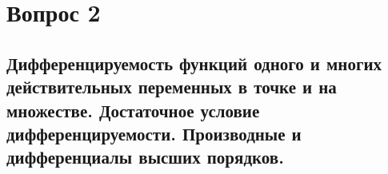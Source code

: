 \section{Вопрос 2}

\subsection{Дифференцируемость функций одного и многих действительных переменных
в точке и на множестве. Достаточное условие дифференцируемости.
Производные и дифференциалы высших порядков.}

\begin{sledsv}

\end{sledsv}
